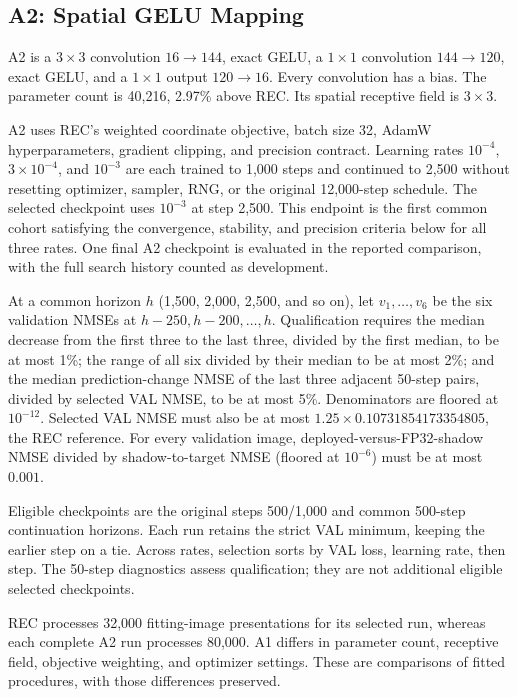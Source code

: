 \documentclass[10pt,twocolumn,letterpaper]{article}
\begin{document}
\subsection{A2: Spatial GELU Mapping}
A2 is a $3\times3$ convolution $16\to144$, exact GELU, a $1\times1$ convolution $144\to120$, exact GELU, and a $1\times1$ output $120\to16$. Every convolution has a bias. The parameter count is 40,216, 2.97\% above REC. Its spatial receptive field is $3\times3$.

A2 uses REC's weighted coordinate objective, batch size 32, AdamW hyperparameters, gradient clipping, and precision contract. Learning rates $10^{-4}$, $3\times10^{-4}$, and $10^{-3}$ are each trained to 1,000 steps and continued to 2,500 without resetting optimizer, sampler, RNG, or the original 12,000-step schedule. The selected checkpoint uses $10^{-3}$ at step 2,500. This endpoint is the first common cohort satisfying the convergence, stability, and precision criteria below for all three rates. One final A2 checkpoint is evaluated in the reported comparison, with the full search history counted as development.

At a common horizon $h$ (1,500, 2,000, 2,500, and so on), let $v_1,\ldots,v_6$ be the six validation NMSEs at $h-250,h-200,\ldots,h$. Qualification requires the median decrease from the first three to the last three, divided by the first median, to be at most 1\%; the range of all six divided by their median to be at most 2\%; and the median prediction-change NMSE of the last three adjacent 50-step pairs, divided by selected VAL NMSE, to be at most 5\%. Denominators are floored at $10^{-12}$. Selected VAL NMSE must also be at most $1.25\times0.10731854173354805$, the REC reference. For every validation image, deployed-versus-FP32-shadow NMSE divided by shadow-to-target NMSE (floored at $10^{-6}$) must be at most $0.001$.

Eligible checkpoints are the original steps 500/1,000 and common 500-step continuation horizons. Each run retains the strict VAL minimum, keeping the earlier step on a tie. Across rates, selection sorts by VAL loss, learning rate, then step. The 50-step diagnostics assess qualification; they are not additional eligible selected checkpoints.

REC processes 32,000 fitting-image presentations for its selected run, whereas each complete A2 run processes 80,000. A1 differs in parameter count, receptive field, objective weighting, and optimizer settings. These are comparisons of fitted procedures, with those differences preserved.
\end{document}
